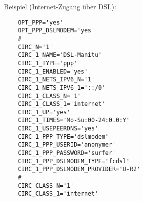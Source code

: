 Beispiel (Internet-Zugang über DSL):

\begin{example}
\begin{verbatim}
    OPT_PPP='yes'
    OPT_PPP_DSLMODEM='yes'
    #
    CIRC_N='1'
    CIRC_1_NAME='DSL-Manitu'
    CIRC_1_TYPE='ppp'
    CIRC_1_ENABLED='yes'
    CIRC_1_NETS_IPV6_N='1'
    CIRC_1_NETS_IPV6_1='::/0'
    CIRC_1_CLASS_N='1'
    CIRC_1_CLASS_1='internet'
    CIRC_1_UP='yes'
    CIRC_1_TIMES='Mo-Su:00-24:0.0:Y'
    CIRC_1_USEPEERDNS='yes'
    CIRC_1_PPP_TYPE='dslmodem'
    CIRC_1_PPP_USERID='anonymer'
    CIRC_1_PPP_PASSWORD='surfer'
    CIRC_1_PPP_DSLMODEM_TYPE='fcdsl'
    CIRC_1_PPP_DSLMODEM_PROVIDER='U-R2'
    #
    CIRC_CLASS_N='1'
    CIRC_CLASS_1='internet'
\end{verbatim}
\end{example}
